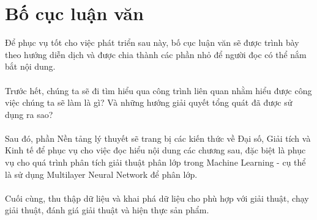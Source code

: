\section{Bố cục luận văn}
Để phục vụ tốt cho việc phát triển sau này, bố cục luận văn sẽ được trình bày 
theo hướng diễn dịch và được chia thành các phần nhỏ để người đọc có thể nắm 
bắt nội dung.\\\\
Trước hết, chúng ta sẽ đi tìm hiểu qua công trình liên quan nhằm hiểu được công việc 
chúng ta sẽ làm là gì? Và những hướng giải quyết tổng quát đã được sử dụng ra 
sao?\\\\
Sau đó, phần Nền tảng lý thuyết sẽ trang bị các kiến thức về Đại số, Giải tích và Kinh tế để 
phục vụ cho việc đọc hiểu nội dung các chương sau, đặc biệt là phục vụ cho quá 
trình phân tích giải thuật phân lớp trong Machine Learning - cụ thể là sử dụng 
Multilayer Neural Network để phân lớp.\\\\
Cuối cùng, thu thập dữ liệu và khai phá dữ liệu cho phù hợp với giải thuật, 
chạy giải thuật, đánh giá giải thuật và hiện thực sản phẩm.
